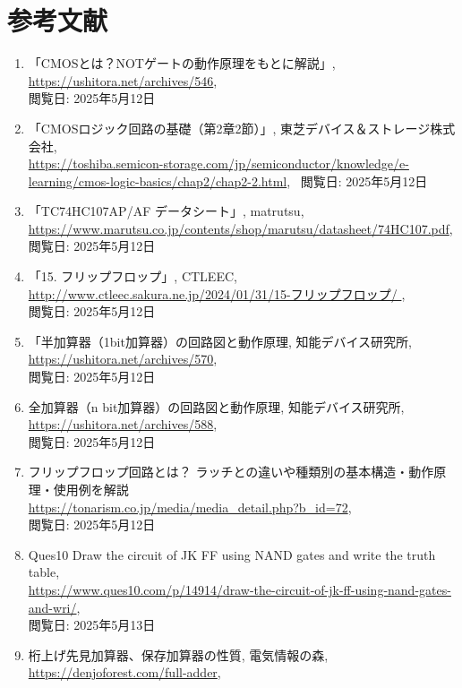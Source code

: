 \documentclass{jlreq}
\numberwithin{equation}{section}
\begin{document}
\section{参考文献}
\begin{enumerate}
\item 「CMOSとは？NOTゲートの動作原理をもとに解説」, \\
\url{https://ushitora.net/archives/546}, \\
閲覧日: 2025年5月12日
\item 「CMOSロジック回路の基礎（第2章2節）」, 東芝デバイス＆ストレージ株式会社, \\
\url{https://toshiba.semicon-storage.com/jp/semiconductor/knowledge/e-learning/cmos-logic-basics/chap2/chap2-2.html}, \
閲覧日: 2025年5月12日
\item 「TC74HC107AP/AF データシート」, matrutsu, \\
\url{https://www.marutsu.co.jp/contents/shop/marutsu/datasheet/74HC107.pdf}, \\
閲覧日: 2025年5月12日
\item 「15. フリップフロップ」, CTLEEC, \\
\url{http://www.ctleec.sakura.ne.jp/2024/01/31/15-フリップフロップ/ }, \\
閲覧日: 2025年5月12日
\item 「半加算器（1bit加算器）の回路図と動作原理, 知能デバイス研究所, \\
\url{https://ushitora.net/archives/570}, \\
閲覧日: 2025年5月12日
\item 全加算器（n bit加算器）の回路図と動作原理, 知能デバイス研究所, \\
\url{https://ushitora.net/archives/588}, \\
閲覧日: 2025年5月12日
\item フリップフロップ回路とは？ ラッチとの違いや種類別の基本構造・動作原理・使用例を解説 \\
\url{https://tonarism.co.jp/media/media_detail.php?b_id=72}, \\
閲覧日: 2025年5月12日
\item Ques10 Draw the circuit of JK FF using NAND gates and write the truth table, \\
\url{https://www.ques10.com/p/14914/draw-the-circuit-of-jk-ff-using-nand-gates-and-wri/}, \\
閲覧日: 2025年5月13日
\item 桁上げ先見加算器、保存加算器の性質, 電気情報の森, \\
\url{https://denjoforest.com/full-adder}, \\

\end{enumerate}
\end{document}

